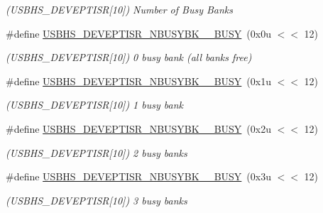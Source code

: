 \begin{DoxyCompactItemize}
\begin{DoxyCompactList}\small\item\em (U\+S\+B\+H\+S\+\_\+\+D\+E\+V\+E\+P\+T\+I\+SR\mbox{[}10\mbox{]}) Number of Busy Banks \end{DoxyCompactList}\item 
\mbox{\label{group__SAMS70__USBHS_ga1d6f576b3dd9ea1df914ac0f6955a12e}} 
\#define \mbox{\hyperlink{group__SAMS70__USBHS_ga1d6f576b3dd9ea1df914ac0f6955a12e}{U\+S\+B\+H\+S\+\_\+\+D\+E\+V\+E\+P\+T\+I\+S\+R\+\_\+\+N\+B\+U\+S\+Y\+B\+K\+\_\+\_\+\+B\+U\+SY}}~(0x0u $<$$<$ 12)
\begin{DoxyCompactList}\small\item\em (U\+S\+B\+H\+S\+\_\+\+D\+E\+V\+E\+P\+T\+I\+SR\mbox{[}10\mbox{]}) 0 busy bank (all banks free) \end{DoxyCompactList}\item 
\mbox{\label{group__SAMS70__USBHS_gaa68c69091069c73fd28083895e80d878}} 
\#define \mbox{\hyperlink{group__SAMS70__USBHS_gaa68c69091069c73fd28083895e80d878}{U\+S\+B\+H\+S\+\_\+\+D\+E\+V\+E\+P\+T\+I\+S\+R\+\_\+\+N\+B\+U\+S\+Y\+B\+K\+\_\+\_\+\+B\+U\+SY}}~(0x1u $<$$<$ 12)
\begin{DoxyCompactList}\small\item\em (U\+S\+B\+H\+S\+\_\+\+D\+E\+V\+E\+P\+T\+I\+SR\mbox{[}10\mbox{]}) 1 busy bank \end{DoxyCompactList}\item 
\mbox{\label{group__SAMS70__USBHS_gad73f58e4156b8dd35070b4a14408aa20}} 
\#define \mbox{\hyperlink{group__SAMS70__USBHS_gad73f58e4156b8dd35070b4a14408aa20}{U\+S\+B\+H\+S\+\_\+\+D\+E\+V\+E\+P\+T\+I\+S\+R\+\_\+\+N\+B\+U\+S\+Y\+B\+K\+\_\+\_\+\+B\+U\+SY}}~(0x2u $<$$<$ 12)
\begin{DoxyCompactList}\small\item\em (U\+S\+B\+H\+S\+\_\+\+D\+E\+V\+E\+P\+T\+I\+SR\mbox{[}10\mbox{]}) 2 busy banks \end{DoxyCompactList}\item 
\mbox{\label{group__SAMS70__USBHS_gaa39743799ddb041a3cb76d050d638892}} 
\#define \mbox{\hyperlink{group__SAMS70__USBHS_gaa39743799ddb041a3cb76d050d638892}{U\+S\+B\+H\+S\+\_\+\+D\+E\+V\+E\+P\+T\+I\+S\+R\+\_\+\+N\+B\+U\+S\+Y\+B\+K\+\_\+\_\+\+B\+U\+SY}}~(0x3u $<$$<$ 12)
\begin{DoxyCompactList}\small\item\em (U\+S\+B\+H\+S\+\_\+\+D\+E\+V\+E\+P\+T\+I\+SR\mbox{[}10\mbox{]}) 3 busy banks \end{DoxyCompactList}\item 

\end{DoxyCompactItemize}

